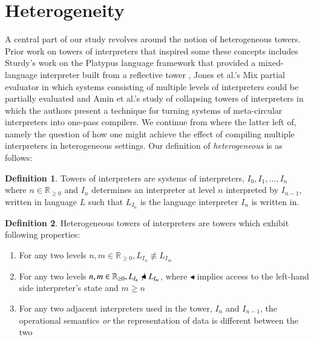 \documentclass[a4paper,12pt,twoside,openright]{report}
\theoremstyle{definition}
\newtheorem{definition}{Definition}[section]
\begin{document}
\section{Heterogeneity}\label{sec:heterogeneity}
A central part of our study revolves around the notion of heterogeneous towers. Prior work on towers of interpreters that inspired some these concepts includes Sturdy's work on the Platypus language framework that provided a mixed-language interpreter built from a reflective tower \cite{sturdy1993lisp}, Jones et al.'s Mix partial evaluator \cite{jones1989mix} in which systems consisting of multiple levels of interpreters could be partially evaluated and Amin et al.'s study of collapsing towers of interpreters in which the authors present a technique for turning systems of meta-circular interpreters into one-pass compilers. We continue from where the latter left of, namely the question of how one might achieve the effect of compiling multiple interpreters in heterogeneous settings. Our definition of \textit{heterogeneous} is as follows:
\theoremstyle{definition}
\begin{definition}
	Towers of interpreters are systems of interpreters, $I_0, I_1, ..., I_n$ where $n \in \mathbb R_{\ge 0}$ and $I_n$ determines an interpreter at level $n$ interpreted by $I_{n-1}$, written in language $L$ such that $L_{I_n}$ is the language interpreter $I_n$ is written in.
\end{definition}


\begin{definition}
    \label{def:het}
	Heterogeneous towers of interpreters are towers which exhibit following properties:
	\begin{enumerate}
		\item For any two levels $n, m \in \mathbb R_{\ge 0}, L_{I_n} \not\equiv L_{I_m}$
		\item For any two levels $n, m \in \mathbb R_{\ge 0}, L_{I_n} \not\blacktriangleleft L_{I_m}$, where $\blacktriangleleft$ implies access to the left-hand side interpreter's state and $m \ge n$
		\item For any two adjacent interpreters used in the tower, $I_{n}$ and $I_{n-1}$, the operational semantics \textit{or} the representation of data is different between the two
	\end{enumerate}
\end{definition}
\end{document}
